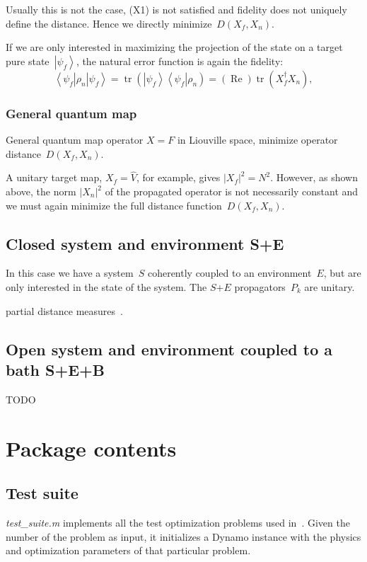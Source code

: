 \documentclass[aps, pra, a4paper, longbibliography]{revtex4}
\newcommand{\be}{\begin{equation}}
\newcommand{\ee}{\end{equation}}
\newcommand{\ket}[1]{\left| #1 \right \rangle}
\newcommand{\bra}[1]{\left \langle #1 \right|}
\newcommand{\ketbra}[2]{\left| #1 \right \rangle \left \langle #2 \right|}
\DeclareMathOperator{\tr}{tr}
\DeclareMathOperator{\re}{Re}
\begin{document}
Usually this is not the case, (X1) is not satisfied and fidelity does not uniquely define the distance.
Hence we directly minimize~$D(X_f, X_n)$.


If we are only interested in maximizing the projection of
the state on a target pure state~$\ket{\psi_f}$, the natural error
function is again the fidelity:
\be
\bra{\psi_f} \rho_n \ket{\psi_f}
= \tr\left(\ketbra{\psi_f}{\psi_f} \rho_n \right)
= (\re) \tr\left(X_f^\dagger X_n\right),
\ee




\subsubsection{General quantum map}

General quantum map operator $X = F$ in Liouville space,
minimize operator distance~$D(X_f, X_n)$.

A unitary target map,
$X_f = \hat{V}$, for example, gives $|X_f|^2 = N^2$.
However, as shown above, the norm $|X_n|^2$ of the propagated operator
is not necessarily constant and we must again minimize the full distance function~$D(X_f, X_n)$.




\subsection{Closed system and environment S+E}

In this case we have a system~$S$ coherently coupled to an
environment~$E$, but are only interested in the state of the system.
The $S$+$E$ propagators~$P_k$ are unitary.

partial distance measures~\cite{kosut_2006}.

\subsection{Open system and environment coupled to a bath S+E+B}

TODO




\section{Package contents}

\subsection{Test suite}
\emph{test\_suite.m} implements all the test optimization problems used in~\cite{machnes_2011}.
Given the number of the problem as input, it initializes a Dynamo
instance with the physics and optimization parameters of that particular problem.
\end{document}
